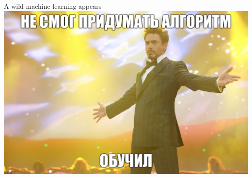 \documentclass[aspectratio=169]{beamer}
\begin{document}
\begin{frame}{A wild machine learning appears}
    \centering
    \includegraphics[width=.715\linewidth]{graphs/fig13.jpg}
\end{frame}
\end{document}
